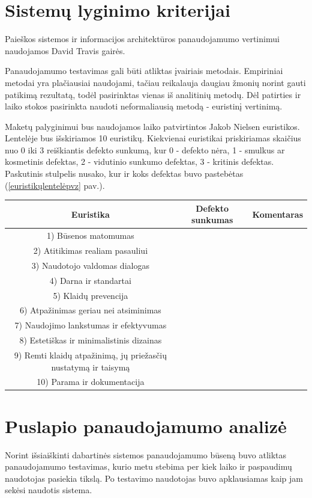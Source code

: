 \documentclass{VUMIFPSkursinis}
\begin{document}
\section{Sistemų lyginimo kriterijai}
Paieškos sistemos ir informacijos architektūros panaudojamumo vertinimui naudojamos David Travis gairės\cite{SearchGuidelinesEn}\cite{NavigationAndIAGuidelinesEn}.

Panaudojamumo testavimas gali būti atliktas įvairiais metodais. Empiriniai metodai yra plačiausiai naudojami\cite{NielsenUsabilityEn}, tačiau reikalauja daugiau žmonių norint gauti patikimą rezultatą, todėl pasirinktas vienas iš analitinių metodų. Dėl patirties ir laiko stokos pasirinkta naudoti neformaliausią metodą - euristinį vertinimą.

Maketų palyginimui bus naudojamos laiko patvirtintos Jakob Nielsen euristikos\cite{NielsenHeuristicsEn}. Lentelėje bus išskiriamos 10 euristikų. Kiekvienai euristikai priskiriamas skaičius nuo 0 iki 3 reiškiantis defekto sunkumą, kur 0 - defekto nėra, 1 - smulkus ar kosmetinis defektas, 2 - vidutinio sunkumo defektas, 3 - kritinis defektas. Paskutinis stulpelis nusako, kur ir koks defektas buvo pastebėtas (\ref{euristikųlentelėpvz} pav.).
\begin{center}
\begin{tabular}{ |c|c|c| } 
 \hline
	Euristika & Defekto sunkumas & Komentaras \\ \hline
	1) Būsenos matomumas &  &  \\ \hline
	2) Atitikimas realiam pasauliui  &  &  \\ \hline
	3) Naudotojo valdomas dialogas &  &  \\ \hline
	4) Darna ir standartai &  &  \\ \hline
	5) Klaidų prevencija &  &  \\ \hline
	6) Atpažinimas geriau nei atsiminimas &  &  \\ \hline
	7) Naudojimo lankstumas ir efektyvumas &  &  \\ \hline
	8) Estetiškas ir minimalistinis dizainas &  &  \\ \hline
	9) Remti klaidų atpažinimą, jų priežasčių nustatymą ir taisymą &  &  \\ \hline
	10) Parama ir dokumentacija &  &  \\ \hline
\end{tabular}
\label{euristikųlentelėpvz}
\end{center}

\section{Puslapio panaudojamumo analizė}
Norint išsiaiškinti dabartinės sistemos panaudojamumo būseną buvo atliktas panaudojamumo testavimas, kurio metu stebima per kiek laiko ir paspaudimų naudotojas pasiekia tikslą. Po testavimo naudotojas buvo apklausiamas kaip jam sekėsi naudotis sistema.
\end{document}
